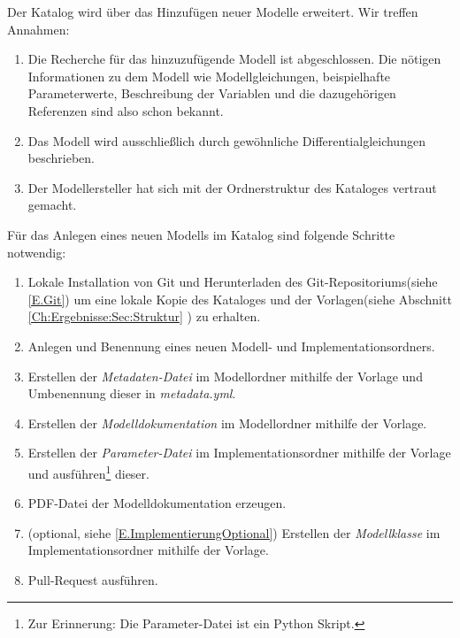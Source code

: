Der Katalog wird über das Hinzufügen neuer Modelle erweitert. Wir treffen Annahmen:
\begin{enumerate}
	\item Die Recherche für das hinzuzufügende Modell ist abgeschlossen. Die nötigen Informationen zu dem Modell wie Modellgleichungen, beispielhafte Parameterwerte, Beschreibung der Variablen und die dazugehörigen Referenzen sind also schon bekannt.
	\item Das Modell wird ausschließlich durch gewöhnliche Differentialgleichungen beschrieben.
	\item Der Modellersteller hat sich mit der Ordnerstruktur des Kataloges vertraut gemacht.
\end{enumerate}

Für das Anlegen eines neuen Modells im Katalog sind folgende Schritte notwendig:
\begin{enumerate}
	\item Lokale Installation von Git und Herunterladen des Git-Repositoriums(siehe \ref{E.Git}) um eine lokale Kopie des Kataloges und der Vorlagen(siehe Abschnitt \ref{Ch:Ergebnisse:Sec:Struktur} ) zu erhalten.
	\item Anlegen und Benennung eines neuen Modell- und Implementationsordners.
	\item Erstellen der \textit{Metadaten-Datei} im Modellordner mithilfe der Vorlage und Umbenennung dieser in \textit{metadata.yml}.
	\item Erstellen der \textit{Modelldokumentation} im Modellordner mithilfe der Vorlage.
	\item Erstellen der \textit{Parameter-Datei} im Implementationsordner mithilfe der Vorlage und ausführen\footnote{Zur Erinnerung: Die Parameter-Datei ist ein Python Skript.} dieser.
	\item PDF-Datei der Modelldokumentation erzeugen.
	\item (optional, siehe \ref{E.ImplementierungOptional}) Erstellen der \textit{Modellklasse} im Implementationsordner mithilfe der Vorlage.
	\item Pull-Request ausführen.
\end{enumerate}





